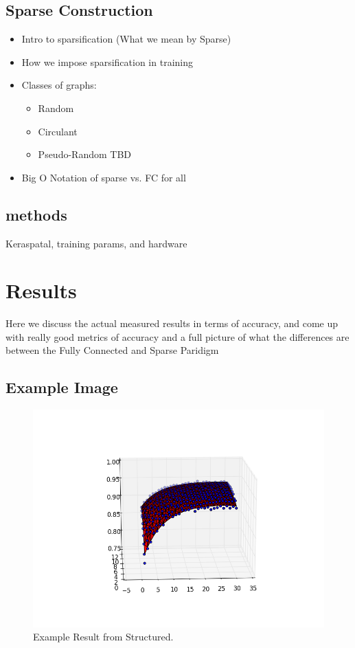 \documentclass{article}
\begin{document}
\subsection{Sparse Construction}
\begin{itemize}
\item Intro to sparsification (What we mean by Sparse)
\item How we impose sparsification in training
\item Classes of graphs:
\begin{itemize}
\item Random
\item Circulant
\item Pseudo-Random TBD
\end{itemize}
\item Big O Notation of sparse vs. FC for all
\end{itemize}
\subsection{methods}
Keraspatal, training params, and hardware


\section{Results}

Here we discuss the actual measured results in terms of accuracy, and come up with really good metrics of accuracy and a full picture of what the differences are between the Fully Connected and Sparse Paridigm

\subsection{Example Image}
\begin{figure}[ht]
\vskip 0.2in
\begin{center}
\centerline{\includegraphics[width=\columnwidth]{Images/example_result.png}}
\caption{Example Result from Structured.}
\label{icml-historical}
\end{center}
\vskip -0.2in
\end{figure} 
\end{document}
